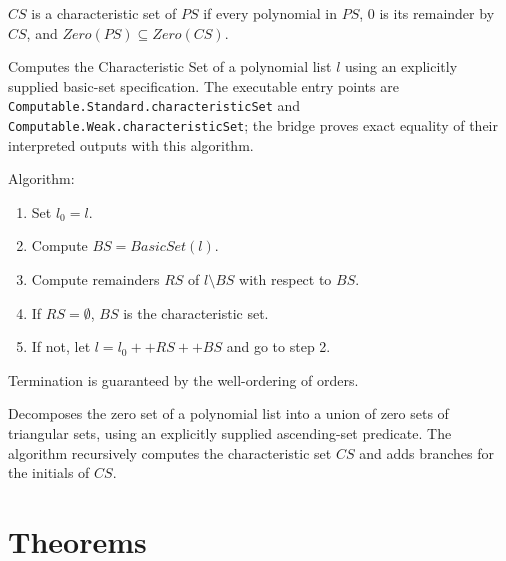 \begin{definition}
    \label{def:IsCharacteristicSet}
    \leanok
    $CS$ is a characteristic set of $PS$ if every polynomial in $PS$, $0$ is its remainder by $CS$, and $Zero(PS) \subseteq Zero(CS)$.
\end{definition}

\begin{definition}
    \label{def:characteristicSet}
    \leanok
    Computes the Characteristic Set of a polynomial list $l$ using an explicitly supplied basic-set specification. The executable entry points are \texttt{Computable.Standard.characteristicSet} and \texttt{Computable.Weak.characteristicSet}; the bridge proves exact equality of their interpreted outputs with this algorithm.

    Algorithm:
    \begin{enumerate}
        \item Set $l_0 = l$.
        \item Compute $BS = BasicSet(l)$.
        \item Compute remainders $RS$ of $l \setminus BS$ with respect to $BS$.
        \item If $RS = \emptyset$, $BS$ is the characteristic set.
        \item If not, let $l = l_0 ++ RS ++ BS$ and go to step 2.
    \end{enumerate}
    Termination is guaranteed by the well-ordering of orders.
\end{definition}

\begin{definition}
    \label{def:zeroDecomposition}
    \leanok
    Decomposes the zero set of a polynomial list into a union of zero sets of triangular sets,
    using an explicitly supplied ascending-set predicate.
    The algorithm recursively computes the characteristic set $CS$
    and adds branches for the initials of $CS$.
\end{definition}

\chapter{Theorems}
\label{chap:thm}

